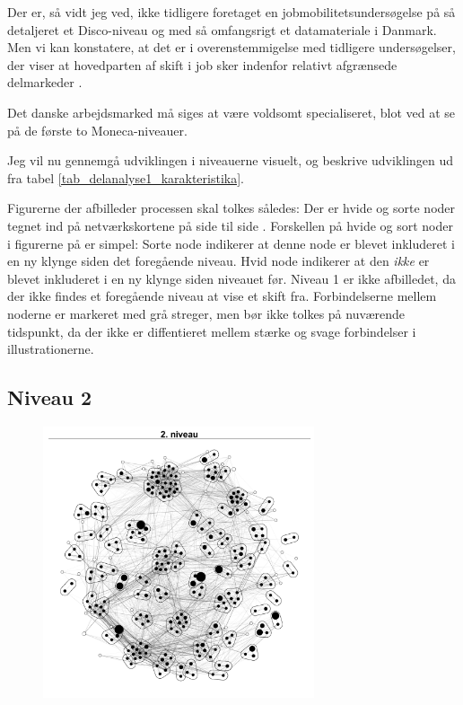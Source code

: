 Der er, så vidt jeg ved, ikke tidligere foretaget en jobmobilitetsundersøgelse på så detaljeret et Disco-niveau og med så omfangsrigt et datamateriale i Danmark. Men vi kan konstatere, at det er i overenstemmigelse med tidligere undersøgelser, der viser at hovedparten af skift i job sker indenfor relativt afgrænsede delmarkeder \parencite[124]{BojeToft1989}. 

Det danske arbejdsmarked må siges at være voldsomt specialiseret, blot ved at se på de første to Moneca-niveauer. 

Jeg vil nu gennemgå udviklingen i niveauerne visuelt, og beskrive udviklingen ud fra tabel \ref{tab_delanalyse1_karakteristika}.

Figurerne der afbilleder processen skal tolkes således: Der er hvide og sorte noder tegnet ind på netværkskortene på side \pageref{fig_delanalyse1_kort_seg_proces2} til side \pageref{fig_delanalyse1_kort_seg_proces5} . Forskellen på hvide og sort noder i figurerne på er simpel: Sorte node indikerer at denne node er blevet inkluderet i en ny klynge siden det foregående niveau. Hvid node indikerer at den \emph{ikke} er blevet inkluderet i en ny klynge siden niveauet før. 
Niveau 1 er ikke afbilledet, da der ikke findes et foregående niveau at vise et skift fra. 
Forbindelserne mellem noderne er markeret med grå streger, men bør ikke tolkes på nuværende tidspunkt, da der ikke er diffentieret mellem stærke og svage forbindelser i illustrationerne. 


\newpage \subsection{Niveau 2}


\begin{figure}
  \vspace{-20pt}
  \begin{center}
   \caption{}
   \label{fig_delanalyse1_kort_seg_proces2}
    \includegraphics[width=8cm]{fig/netvaerkskort/kort_seg_proces2.pdf}
    \label{fig_delanalyse1_kort_seg_proces2}
  \end{center}
  \vspace{-20pt}
\end{figure}

